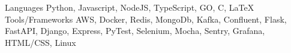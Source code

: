 \begin{cvskills}
  \cvskill
  {Languages}
  {Python, Javascript, NodeJS, TypeScript, GO, C, \LaTeX}
  \cvskill
  {Tools/Frameworks}
  {AWS, Docker, Redis, MongoDb, Kafka, Confluent, Flask, FastAPI, Django, Express, PyTest, Selenium, Mocha, Sentry, Grafana, HTML/CSS, Linux}
\end{cvskills}